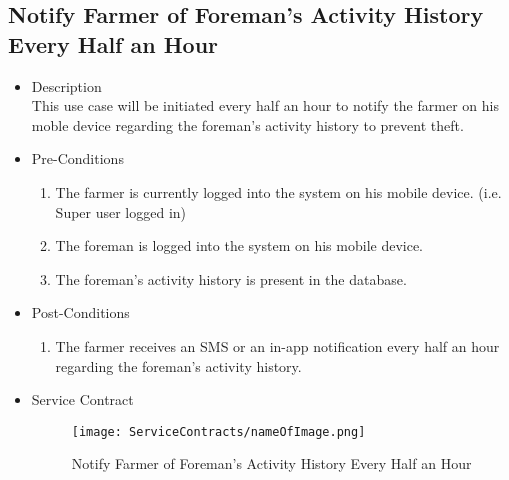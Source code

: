 \documentclass[11pt,fleqn]{book} %
\begin{document}
\subsection{Notify Farmer of Foreman’s Activity History Every Half an Hour}
\begin{itemize}
	\item Description\\
	This use case will be initiated every half an hour to notify the farmer on his moble device regarding the foreman’s activity history to prevent theft.
	\item Pre-Conditions
	\begin{enumerate}
		\item The farmer is currently logged into the system on his mobile device. (i.e. Super user logged in)
		\item The foreman is logged into the system on his mobile device.
		\item The foreman’s activity history is present in the database.					
	\end{enumerate}
	\item Post-Conditions
	\begin{enumerate}
		\item The farmer receives an SMS or an in-app notification every half an hour regarding the foreman’s activity history.
	\end{enumerate}
	\item Service Contract
	\begin{figure}
		\texttt{[image: ServiceContracts/nameOfImage.png]}
		\caption{Notify Farmer of Foreman’s Activity History Every Half an Hour}
		\end{figure}
\end{itemize}
\end{document}
